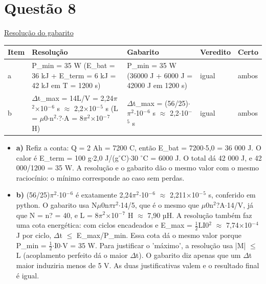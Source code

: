 \documentclass{article}%
\begin{document}
\section*{Questão 8}%
\href{https://poliedroresolve.sistemapoliedro.com.br/vestibulares/ita/2026/ita-2-fase-dia-3-30-10-2025-2-fase-dia-3/dissertativa-8-fisica-2-fase-dia-3-ita-2026}{Resolução do gabarito}\par\smallskip%
\begin{longtable}{@{}p{} p{} p{} p{} p{}@{}}\toprule Item & Resolução & Gabarito & Veredito & Certo \\ \midrule
a & P\_min = 35 W (E\_bat = 36 kJ + E\_term = 6 kJ = 42 kJ em T = 1200 s) & P\_min = 35 W (36000 J + 6000 J = 42000 J em 1200 s) & igual & ambos \\
b & $\Delta$t\_max = 14L/V = 2,24$\pi$$^2$$\times$10$^{-}$$^{6}$ s $\approx$ 2,2$\times$10$^{-}$$^{5}$ s (L = $\mu$0$\cdot$n$^2$$\cdot$?$\cdot$A = 8$\pi$$^2$$\times$10$^{-}$$^{7}$ H) & $\Delta$t\_max = (56/25)$\cdot$$\pi$$^2$$\cdot$10$^{-}$$^{6}$ s $\approx$ 2,2$\cdot$10$^{-}$$^{5}$ s & igual & ambos \\
\bottomrule\end{longtable}%
\begin{itemize}%
\item%
\textbf{a)} Refiz a conta: Q = 2 Ah = 7200 C, então E\_bat = 7200$\cdot$5,0 = 36 000 J. O calor é E\_term = 100 g$\cdot$2,0 J/(g$^\circ$C)$\cdot$30 $^\circ$C = 6000 J. O total dá 42 000 J, e 42 000/1200 = 35 W. A resolução e o gabarito dão o mesmo valor com o mesmo raciocínio: o mínimo corresponde ao caso sem perdas.%
\item%
\textbf{b)} (56/25)$\pi$$^2$$\cdot$10$^{-}$$^{6}$ é exatamente 2,24$\pi$$^2$$\cdot$10$^{-}$$^{6}$ $\approx$ 2,211$\times$10$^{-}$$^{5}$ s, conferido em python. O gabarito usa N$\mu$0n$\pi$r$^2$$\cdot$14/5, que é o mesmo que $\mu$0n$^2$?A$\cdot$14/V, já que N = n? = 40, e L = 8$\pi$$^2$$\times$10$^{-}$$^{7}$ H $\approx$ 7,90 µH. A resolução também faz uma cota energética: com ciclos encadeados e E\_max = $\frac12$LI0$^2$ $\approx$ 7,74$\times$10$^{-}$$^{4}$ J por ciclo, $\Delta$t $\leq$ E\_max/P\_min. Essa cota dá o mesmo valor porque P\_min = $\frac12$$\cdot$I0$\cdot$V = 35 W. Para justificar o 'máximo', a resolução usa |M| $\leq$ L (acoplamento perfeito dá o maior $\Delta$t). O gabarito diz apenas que um $\Delta$t maior induziria menos de 5 V. As duas justificativas valem e o resultado final é igual.%
\end{itemize}%
\end{document}
